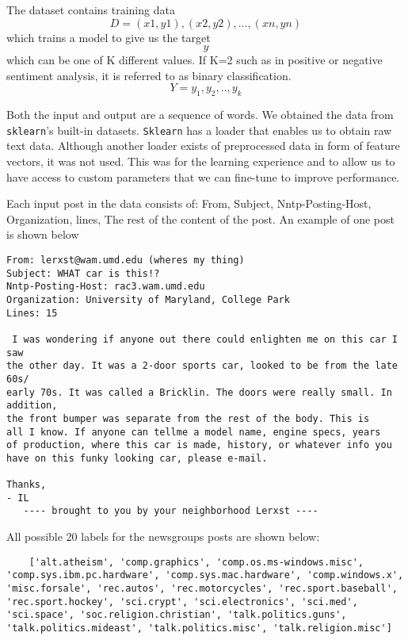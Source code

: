 \documentclass{article}
\begin{document}
The dataset contains training data
\begin{equation}
  D =  {(x1,y1),(x2,y2),...,(xn,yn)}
\end{equation}
which trains a model to give us the target 
 \begin{equation}
y
\end{equation}
which can be one of K different values. If K=2 such as in positive or negative sentiment analysis, it is referred to as binary classification.
\begin{equation}
Y = {y_1,y_2,..,y_k}
\end{equation}

Both the input and output are a sequence of words. We obtained the data from \texttt{sklearn}'s built-in datasets. \texttt{Sklearn} has a loader that enables us to obtain raw text data. Although another loader exists of preprocessed data in form of feature vectors, it was not used. This was for the learning experience and to allow us to have access to custom parameters that we can fine-tune to improve performance.

Each input post in the data consists of: From, Subject, Nntp-Posting-Host, Organization, lines, The rest of the content of the post. An example of one post is shown below

\begin{lstlisting}
From: lerxst@wam.umd.edu (wheres my thing)
Subject: WHAT car is this!?
Nntp-Posting-Host: rac3.wam.umd.edu
Organization: University of Maryland, College Park
Lines: 15

 I was wondering if anyone out there could enlighten me on this car I saw
the other day. It was a 2-door sports car, looked to be from the late 60s/
early 70s. It was called a Bricklin. The doors were really small. In addition,
the front bumper was separate from the rest of the body. This is 
all I know. If anyone can tellme a model name, engine specs, years
of production, where this car is made, history, or whatever info you
have on this funky looking car, please e-mail.

Thanks,
- IL
   ---- brought to you by your neighborhood Lerxst ----
\end{lstlisting} 

All possible  20 labels for the newsgroups posts are shown below:

\begin{lstlisting}
    ['alt.atheism', 'comp.graphics', 'comp.os.ms-windows.misc', 'comp.sys.ibm.pc.hardware', 'comp.sys.mac.hardware', 'comp.windows.x', 'misc.forsale', 'rec.autos', 'rec.motorcycles', 'rec.sport.baseball', 'rec.sport.hockey', 'sci.crypt', 'sci.electronics', 'sci.med', 'sci.space', 'soc.religion.christian', 'talk.politics.guns', 'talk.politics.mideast', 'talk.politics.misc', 'talk.religion.misc']
\end{lstlisting} 
\end{document}
